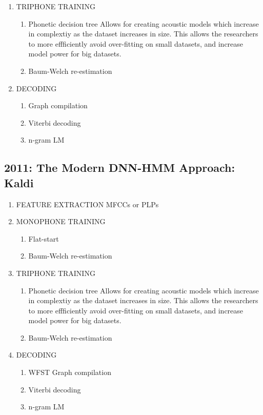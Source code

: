 \documentclass[10pt,a4paper]{article}
\begin{document}
\begin{enumerate}
\item TRIPHONE TRAINING
    \begin{enumerate}
    \item Phonetic decision tree
      Allows for creating acoustic models which increase in complextiy as the dataset increases in size. This allows the researchers to more effficiently avoid over-fitting on small datasets, and increase model power for big datasets.
    \item Baum-Welch re-estimation
    \end{enumerate}

\item DECODING
  \begin{enumerate}
  \item Graph compilation
  \item Viterbi decoding
  \item n-gram LM
  \end{enumerate}
  
\end{enumerate}






\subsection{2011: The Modern DNN-HMM Approach: Kaldi}

\begin{enumerate}

\item FEATURE EXTRACTION
  MFCCs or PLPs

\item MONOPHONE TRAINING
  \begin{enumerate}
  \item Flat-start
  \item Baum-Welch re-estimation
  \end{enumerate}
  
\item TRIPHONE TRAINING
    \begin{enumerate}
    \item Phonetic decision tree
      Allows for creating acoustic models which increase in complextiy as the dataset increases in size. This allows the researchers to more effficiently avoid over-fitting on small datasets, and increase model power for big datasets.
    \item Baum-Welch re-estimation
    \end{enumerate}

\item DECODING
  \begin{enumerate}
  \item WFST Graph compilation
  \item Viterbi decoding
  \item n-gram LM
  \end{enumerate}
  
\end{enumerate}
\end{document}
